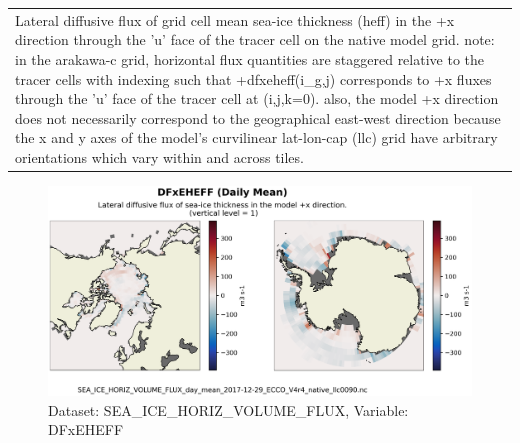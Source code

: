 \begin{longtable}{|m{}|m{}|m{}|m{}|}
\rowcolor{lightgray} \multicolumn{4}{|c|}{\textbf{Comments}} \\ \hline
\multicolumn{4}{|p{1\textwidth}|}{\footnotesize{{Lateral diffusive flux of grid cell mean sea-ice thickness (heff) in the +x direction through the 'u' face of the tracer cell on the native model grid. note: in the arakawa-c grid, horizontal flux quantities are staggered relative to the tracer cells with indexing such that +dfxeheff(i\_g,j) corresponds to +x fluxes through the 'u' face of the tracer cell at (i,j,k=0). also, the model +x direction does not necessarily correspond to the geographical east-west direction because the x and y axes of the model's curvilinear lat-lon-cap (llc) grid have arbitrary orientations which vary within and across tiles.}}} \\ \hline
\end{longtable}

\begin{figure}[H]
\centering
\includegraphics[scale=0.55]{../images/plots/v4r4/native_plots/Sea-Ice_and_Snow_Horizontal_Volume_Fluxes/DFxEHEFF.png}
\caption{Dataset: SEA\_ICE\_HORIZ\_VOLUME\_FLUX, Variable: DFxEHEFF}
\label{tab:table-SEA_ICE_HORIZ_VOLUME_FLUX_DFxEHEFF-Plot}
\end{figure}
\newpage
\pagebreak
